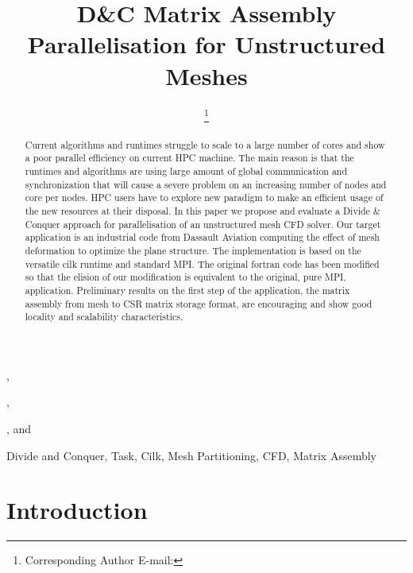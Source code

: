 \documentclass{IOS-Book-Article}
\begin{document}
\begin{frontmatter}              %

\title{D\&C Matrix Assembly Parallelisation for Unstructured Meshes}

\author[A]{ %
\thanks{Corresponding Author E-mail: }},
\author[A]{ },
\author[B]{ },
and
\author[C]{ }

\address[A]{PRISM - University of Versailles, France}
\address[B]{Somwhere}
\address[C]{Dassault Aviation, Saint-Cloud, France}

\begin{abstract}
Current algorithms and runtimes struggle to scale to a large number of cores and show a poor parallel efficiency on current HPC machine. The main reason is that the runtimes and algorithms are
using large amount of global communication and synchronization that will cause a severe problem on an increasing number of nodes and core per nodes. HPC users have to explore new paradigm to
make an efficient usage of the new resources at their disposal. In this paper we propose and evaluate a Divide \& Conquer approach for parallelisation of an unstructured mesh CFD solver.
Our target application is an industrial code from Dassault Aviation computing the effect of mesh deformation to optimize the plane structure. The implementation is based on the versatile cilk
runtime and standard MPI. The original fortran code has been modified so that the elision of our modification is equivalent to the original, pure MPI, application.
Preliminary results on the first step of the application, the matrix assembly from mesh to CSR matrix storage format, are encouraging and show good locality and scalability characteristics.

\end{abstract}

\begin{keyword}
Divide and Conquer, Task, Cilk, Mesh Partitioning, CFD, Matrix Assembly 
\end{keyword}
\end{frontmatter}

\thispagestyle{empty}
\pagestyle{empty}

\section*{Introduction}
\end{document}
